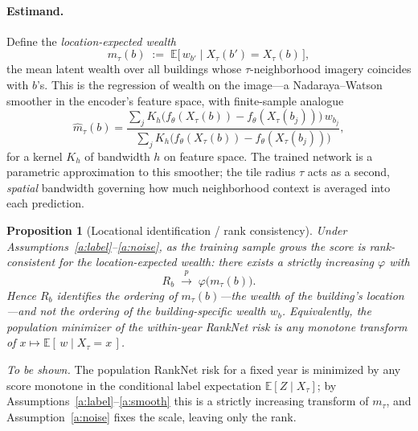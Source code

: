 \documentclass[11pt]{article}
\theoremstyle{plain}
\newtheorem{proposition}{Proposition}
\theoremstyle{remark}
\newcommand{\E}{\mathbb{E}}
\newcommand{\Xt}{X_\tau}
\newcommand{\pto}{\xrightarrow{p}}
\begin{document}
\paragraph{Estimand.}
Define the \emph{location-expected wealth}
\begin{equation}
m_\tau(b)\;:=\;\E\!\big[\,w_{b'}\;\big|\;\Xt(b')=\Xt(b)\,\big],
\end{equation}
the mean latent wealth over all buildings whose $\tau$-neighborhood imagery coincides
with $b$'s. This is the regression of wealth on the image---a Nadaraya--Watson
smoother in the encoder's feature space, with finite-sample analogue
\begin{equation}
\hat m_\tau(b)=
\frac{\sum_j K_h\!\big(f_\theta(\Xt(b))-f_\theta(\Xt(b_j))\big)\,w_{b_j}}
     {\sum_j K_h\!\big(f_\theta(\Xt(b))-f_\theta(\Xt(b_j))\big)},
\end{equation}
for a kernel $K_h$ of bandwidth $h$ on feature space. The trained network is a
parametric approximation to this smoother; the tile radius $\tau$ acts as a second,
\emph{spatial} bandwidth governing how much neighborhood context is averaged into each
prediction.

\begin{proposition}[Locational identification / rank consistency]\label{p:id}
Under Assumptions~\ref{a:label}--\ref{a:noise}, as the training sample grows the score
is rank-consistent for the location-expected wealth: there exists a strictly increasing
$\varphi$ with
\begin{equation}
R_b\;\pto\;\varphi\big(m_\tau(b)\big).
\end{equation}
Hence $R_b$ identifies the ordering of $m_\tau(b)$---the wealth of the building's
\emph{location}---and not the ordering of the building-specific wealth $w_b$.
Equivalently, the population minimizer of the within-year RankNet risk is any monotone
transform of $x\mapsto \E[\,w\mid \Xt=x\,]$.
\end{proposition}

\noindent\emph{To be shown.} The population RankNet risk for a fixed year is minimized
by any score monotone in the conditional label expectation $\E[Z\mid\Xt]$; by
Assumptions~\ref{a:label}--\ref{a:smooth} this is a strictly increasing transform of
$m_\tau$, and Assumption~\ref{a:noise} fixes the scale, leaving only the rank.
\end{document}
